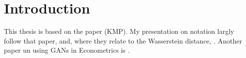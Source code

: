 \section{Introduction}
\label{sec:introduction}

This thesis is based on the paper \textcite{kaji2023adversarial} (KMP).
My presentation on notation largly follow that paper, \textcite{goodfellow2014generative} and, where they relate to the Wasserstein distance, \textcite{arjovsky2017wassersteingan}.
Another paper un using GANs in Econometrics is \textcite{athey2021using}.